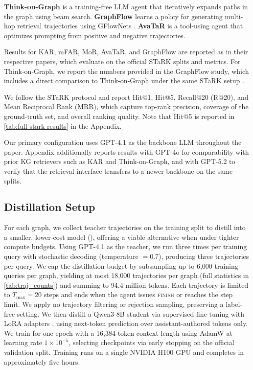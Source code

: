  \textbf{Think-on-Graph} \cite{sun_think--graph_2024} is a training-free LLM agent that iteratively expands paths in the graph using beam search. \textbf{GraphFlow} \cite{yu_can_2025} learns a policy for generating multi-hop retrieval trajectories using GFlowNets \cite{bengio_flow_2021}. \textbf{AvaTaR} \cite{wu_avatar_2024} is a tool-using agent that optimizes prompting from positive and negative trajectories.

Results for KAR, mFAR, MoR, AvaTaR, and GraphFlow are reported as in their respective papers, which evaluate on the official STaRK splits and metrics. For Think-on-Graph, we report the numbers provided in the GraphFlow study, which includes a direct comparison to Think-on-Graph under the same STaRK setup \cite{yu_can_2025,sun_think--graph_2024}.

 We follow the STaRK protocol and report Hit@1, Hit@5, Recall@20 (R@20), and Mean Reciprocal Rank (MRR), which capture top-rank precision, coverage of the ground-truth set, and overall ranking quality. Note that Hit@5 is reported in \cref{tab:full-stark-results} in the Appendix.

 Our primary configuration uses GPT-4.1 as the backbone LLM throughout the paper. Appendix  additionally reports results with GPT-4o for comparability with prior KG retrievers such as KAR and Think-on-Graph, and with GPT-5.2 to verify that the retrieval interface transfers to a newer backbone on the same splits.

\subsection{Distillation Setup}
\label{sec:distillation-setup}

For each graph, we collect teacher trajectories on the training split to distill \retrieverShort into a smaller, lower-cost model (), offering a viable alternative when under tighter compute budgets. Using GPT-4.1 as the teacher, we run \retrieverShort three times per training query with stochastic decoding (temperature $= 0.7$), producing three trajectories per query. We cap the distillation budget by subsampling up to 6{,}000 training queries per graph, yielding at most 18{,}000 trajectories per graph (full statistics in \cref{tab:traj_counts}) and summing to 94.4 million tokens. Each trajectory is limited to $T_{\max}{=}20$ steps and ends when the agent issues \textsc{finish} or reaches the step limit. We apply no trajectory filtering or rejection sampling, preserving a label-free setting. We then distill a Qwen3-8B \cite{yang_qwen3_2025} student via supervised fine-tuning with LoRA adapters \cite{hu_lora_2021}, using next-token prediction over assistant-authored tokens only. We train for one epoch with a 16{,}384-token context length using AdamW \cite{loshchilov_decoupled_2019} at learning rate $1\times 10^{-5}$, selecting checkpoints via early stopping on the official validation split. Training runs on a single NVIDIA H100 GPU and completes in approximately five hours.
